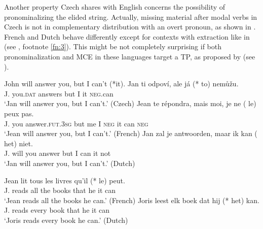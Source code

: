 \documentclass[output=paper,colorlinks,citecolor=brown,
modfonts
]{langscibook}
\begin{document}
\noindent Another property Czech shares with English concerns the possibility of pronominalizing the elided string. Actually, missing material after modal verbs in Czech is not in complementary distribution with an overt pronoun, as shown in . French and Dutch behave differently except for contexts with extraction like in  (see , footnote \ref{fn:3}). This might be not completely surprising if both pronominalization and MCE in these languages target a TP, as proposed by \citet{Dagnac2010} (see ).


\begin{exe}
\ex \label{20}
\begin{xlist}
\ex \label{20a} John will answer you, but I can't (*it).
\ex \label{20b}
\gll Jan  ti    odpoví, ale  já (*\hspace{-2pt} to) nemůžu.\\
J.    you.\textsc{dat} answers but I       {} it   \textsc{neg}.can\\
\glt `Jan will answer you, but I can't.' \hfill (Czech)
\ex \label{20c}
\gll   Jean te    répondra,  mais moi, je ne  (\hspace{-2pt} le) peux pas. \\
J.  you answer.\textsc{fut}.\textsc{3sg} but me I \textsc{neg} {} it can \textsc{neg}\\
\glt `Jean will answer you, but I can't.' \hfill (French)
\ex \label{20d}
\gll  Jan zal je antwoorden, maar ik kan (\hspace{-2pt} het) niet.\\
J. will you answer but I can {} it not\\
\glt `Jan will answer you, but I can't.' \hfill (Dutch)
\end{xlist}
\ex \label{21}
\begin{xlist}
\ex \label{21a}
\gll  Jean  lit tous les livres  qu'il   (*\hspace{-2pt} le) peut.\\
J.  reads all  the books {that he}   {} it   can \\
\glt `Jean reads all the books he can.' \hfill (French)
\ex \label{21b} 
\gll  Joris leest  elk  boek dat hij (*\hspace{-2pt} het) kan.\\
J.   reads every book that he     {} it    can \\
\glt `Joris reads every book he can.' \hfill (Dutch)
\end{xlist}
\end{exe}
\end{document}
